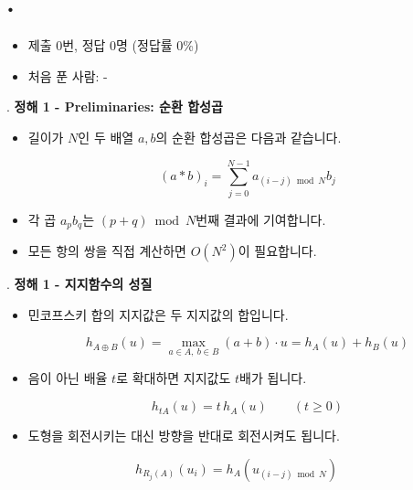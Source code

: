 
\section{\texorpdfstring{\pletter. \ptitle}{문제 \pletter}}

\begin{frame}[label=problem-G]
    \sectiontitle{\pletter}{\ptitle}
    \begin{itemize}
        \item 제출 0번, 정답 0명 (정답률 0\%)
        \item 처음 푼 사람: -
    \end{itemize}
\end{frame}

\begin{frame}{\textbf{\pletter}. \ptitle}
    \textbf{정해 1 - Preliminaries: 순환 합성곱}
    \begin{itemize}
        \item 길이가 $N$인 두 배열 $a,b$의 순환 합성곱은 다음과 같습니다.
    
    \[
        (a*b)_i=\sum_{j=0}^{N-1}a_{(i-j)\bmod N}b_j
    \]
    
        \item 각 곱 $a_pb_q$는 $(p+q)\bmod N$번째 결과에 기여합니다.
        \item 모든 항의 쌍을 직접 계산하면 $O(N^2)$이 필요합니다.
    \end{itemize}
\end{frame}

\begin{frame}{\textbf{\pletter}. \ptitle}
    \textbf{정해 1 - 지지함수의 성질}
    \begin{itemize}
        \item 민코프스키 합의 지지값은 두 지지값의 합입니다.
    
    \[
        h_{A\oplus B}(u)
        =\max_{a\in A,\ b\in B}(a+b)\cdot u
        =h_A(u)+h_B(u)
    \]
    
        \item 음이 아닌 배율 $t$로 확대하면 지지값도 $t$배가 됩니다.
    
    \[
        h_{tA}(u)=t\,h_A(u)\qquad(t\ge0)
    \]
    
        \item 도형을 회전시키는 대신 방향을 반대로 회전시켜도 됩니다.
    \end{itemize}
    \[
        h_{R_j(A)}(u_i)=h_A(u_{(i-j)\bmod N})
    \]
\end{frame}

